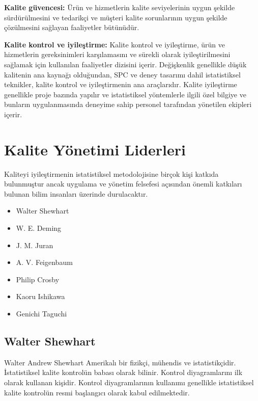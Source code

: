 \documentclass[
]{book}
\providecommand{\tightlist}{%
  \setlength{\itemsep}{0pt}\setlength{\parskip}{0pt}}
\begin{document}
\textbf{Kalite güvencesi:} Ürün ve hizmetlerin kalite seviyelerinin uygun şekilde sürdürülmesini ve tedarikçi ve müşteri kalite sorunlarının uygun şekilde çözülmesini sağlayan faaliyetler bütünüdür.

\textbf{Kalite kontrol ve iyileştirme:} Kalite kontrol ve iyileştirme, ürün ve hizmetlerin gereksinimleri karşılamasını ve sürekli olarak iyileştirilmesini sağlamak için kullanılan faaliyetler dizisini içerir. Değişkenlik genellikle düşük kalitenin ana kaynağı olduğundan, SPC ve deney tasarımı dahil istatistiksel teknikler, kalite kontrol ve iyileştirmenin ana araçlarıdır. Kalite iyileştirme genellikle proje bazında yapılır ve istatistiksel yöntemlerle ilgili özel bilgiye ve bunların uygulanmasında deneyime sahip personel tarafından yönetilen ekipleri içerir.

\hypertarget{kalite-yuxf6netimi-liderleri}{%
\section{Kalite Yönetimi Liderleri}\label{kalite-yuxf6netimi-liderleri}}

Kaliteyi iyileştirmenin istatistiksel metodolojisine birçok kişi katkıda bulunmuştur ancak uygulama ve yönetim felsefesi açısından önemli katkıları bulunan bilim insanları üzerinde durulacaktır.

\begin{itemize}
\tightlist
\item
  Walter Shewhart
\item
  W. E. Deming
\item
  J. M. Juran
\item
  A. V. Feigenbaum
\item
  Philip Crosby
\item
  Kaoru Ishikawa
\item
  Genichi Taguchi
\end{itemize}

\hypertarget{walter-shewhart}{%
\subsection{Walter Shewhart}\label{walter-shewhart}}

Walter Andrew Shewhart Amerikalı bir fizikçi, mühendis ve istatistikçidir. İstatistiksel kalite kontrolün babası olarak bilinir. Kontrol diyagramlarını ilk olarak kullanan kişidir. Kontrol diyagramlarının kullanımı genellikle istatistiksel kalite kontrolün resmi başlangıcı olarak kabul edilmektedir.
\end{document}

